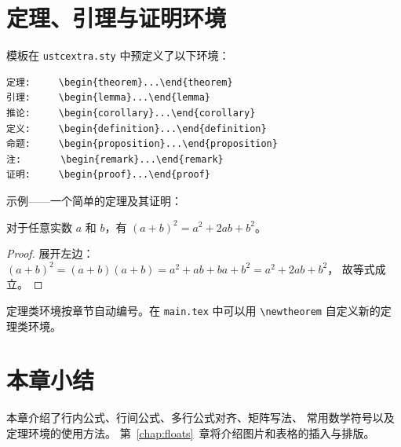 \section{定理、引理与证明环境}

模板在 \texttt{ustcextra.sty} 中预定义了以下环境：

\begin{verbatim}
定理:     \begin{theorem}...\end{theorem}
引理:     \begin{lemma}...\end{lemma}
推论:     \begin{corollary}...\end{corollary}
定义:     \begin{definition}...\end{definition}
命题:     \begin{proposition}...\end{proposition}
注:       \begin{remark}...\end{remark}
证明:     \begin{proof}...\end{proof}
\end{verbatim}

示例——一个简单的定理及其证明：

\begin{theorem}
    对于任意实数 $a$ 和 $b$，有 $(a+b)^2 = a^2 + 2ab + b^2$。
\end{theorem}

\begin{proof}
    展开左边：$(a+b)^2 = (a+b)(a+b) = a^2 + ab + ba + b^2 = a^2 + 2ab + b^2$，
    故等式成立。
\end{proof}

定理类环境按章节自动编号。在 \texttt{main.tex} 中可以用 \verb|\newtheorem| 自定义新的定理类环境。

\section{本章小结}

本章介绍了行内公式、行间公式、多行公式对齐、矩阵写法、
常用数学符号以及定理环境的使用方法。
第~\ref{chap:floats}~章将介绍图片和表格的插入与排版。
